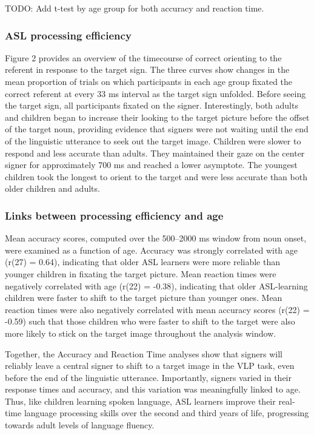 \documentclass[12pt,]{article}
\begin{document}
TODO: Add t-test by age group for both accuracy and reaction time.

\subsubsection{ASL processing
efficiency}\label{asl-processing-efficiency}

Figure 2 provides an overview of the timecourse of correct orienting to
the referent in response to the target sign. The three curves show
changes in the mean proportion of trials on which participants in each
age group fixated the correct referent at every 33 ms interval as the
target sign unfolded. Before seeing the target sign, all participants
fixated on the signer. Interestingly, both adults and children began to
increase their looking to the target picture before the offset of the
target noun, providing evidence that signers were not waiting until the
end of the linguistic utterance to seek out the target image. Children
were slower to respond and less accurate than adults. They maintained
their gaze on the center signer for approximately 700 ms and reached a
lower asymptote. The youngest children took the longest to orient to the
target and were less accurate than both older children and adults.

\subsubsection{Links between processing efficiency and
age}\label{links-between-processing-efficiency-and-age}

Mean accuracy scores, computed over the 500--2000 ms window from noun
onset, were examined as a function of age. Accuracy was strongly
correlated with age (r(27) = 0.64), indicating that older ASL learners
were more reliable than younger children in fixating the target picture.
Mean reaction times were negatively correlated with age (r(22) = -0.38),
indicating that older ASL-learning children were faster to shift to the
target picture than younger ones. Mean reaction times were also
negatively correlated with mean accuracy scores (r(22) = -0.59) such
that those children who were faster to shift to the target were also
more likely to stick on the target image throughout the analysis window.

Together, the Accuracy and Reaction Time analyses show that signers will
reliably leave a central signer to shift to a target image in the VLP
task, even before the end of the linguistic utterance. Importantly,
signers varied in their response times and accuracy, and this variation
was meaningfully linked to age. Thus, like children learning spoken
language, ASL learners improve their real-time language processing
skills over the second and third years of life, progressing towards
adult levels of language fluency.
\end{document}

